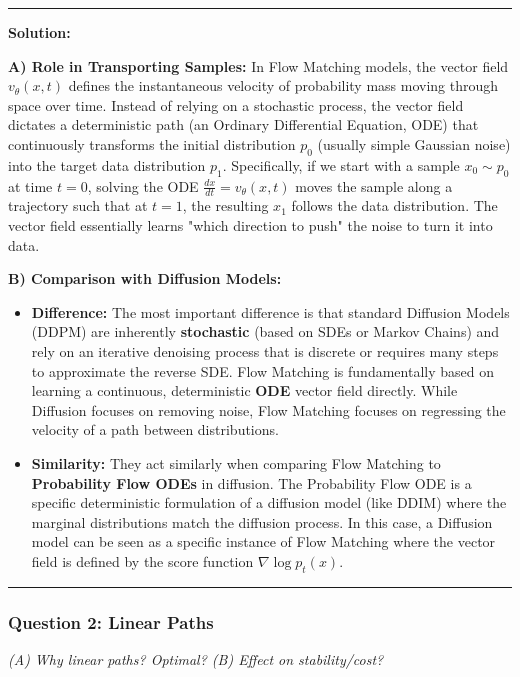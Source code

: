 \documentclass[a4paper,12pt]{article}
\newenvironment{solutionbox}{
    \par
    \vspace{0.5em}
    \noindent
    {\color{primary}\rule{\linewidth}{0.4pt}}
    \par\smallskip
    \noindent\textbf{\color{primary}Solution:}
    \par\smallskip
    \small
}{
    \par\smallskip
    {\color{primary}\rule{\linewidth}{0.4pt}}
    \par\vspace{0.5em}
}
\begin{document}
\begin{solutionbox}
    \textbf{A) Role in Transporting Samples:}
    In Flow Matching models, the vector field $v_\theta(x, t)$ defines the instantaneous velocity of probability mass moving through space over time. Instead of relying on a stochastic process, the vector field dictates a deterministic path (an Ordinary Differential Equation, ODE) that continuously transforms the initial distribution $p_0$ (usually simple Gaussian noise) into the target data distribution $p_1$. Specifically, if we start with a sample $x_0 \sim p_0$ at time $t=0$, solving the ODE $\frac{dx}{dt} = v_\theta(x, t)$ moves the sample along a trajectory such that at $t=1$, the resulting $x_1$ follows the data distribution. The vector field essentially learns "which direction to push" the noise to turn it into data.

    \textbf{B) Comparison with Diffusion Models:}
    \begin{itemize}
        \item \textbf{Difference:} The most important difference is that standard Diffusion Models (DDPM) are inherently \textbf{stochastic} (based on SDEs or Markov Chains) and rely on an iterative denoising process that is discrete or requires many steps to approximate the reverse SDE. Flow Matching is fundamentally based on learning a continuous, deterministic \textbf{ODE} vector field directly. While Diffusion focuses on removing noise, Flow Matching focuses on regressing the velocity of a path between distributions.
        \item \textbf{Similarity:} They act similarly when comparing Flow Matching to \textbf{Probability Flow ODEs} in diffusion. The Probability Flow ODE is a specific deterministic formulation of a diffusion model (like DDIM) where the marginal distributions match the diffusion process. In this case, a Diffusion model can be seen as a specific instance of Flow Matching where the vector field is defined by the score function $\nabla \log p_t(x)$.
    \end{itemize}
\end{solutionbox}

\subsubsection{Question 2: Linear Paths}
\textit{(A) Why linear paths? Optimal? (B) Effect on stability/cost?}
\end{document}
